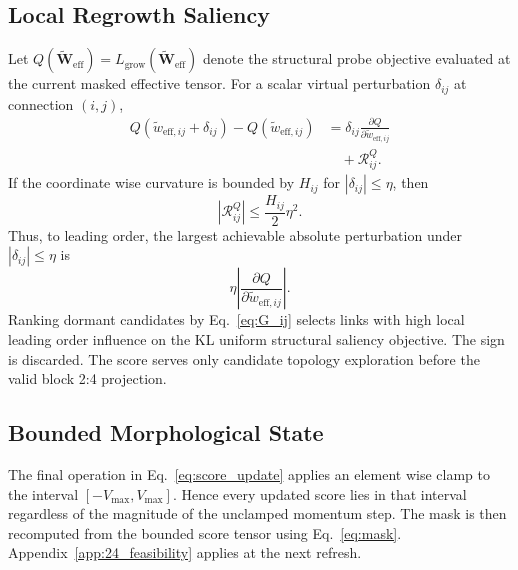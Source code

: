 \documentclass[letterpaper]{article}
\begin{document}
\subsection{Local Regrowth Saliency}
\label{app:regrowth_saliency}
Let $Q(\widetilde{\bm{W}}_{\text{eff}})=L_{\text{grow}}(\widetilde{\bm{W}}_{\text{eff}})$ denote the structural probe objective evaluated at the current masked effective tensor. For a scalar virtual perturbation $\delta_{ij}$ at connection $(i,j)$,
\begin{equation}
\begin{aligned}
    Q(\widetilde w_{\mathrm{eff},ij}+\delta_{ij})
    -Q(\widetilde w_{\mathrm{eff},ij})
    &=\delta_{ij}\frac{\partial Q}
    {\partial\widetilde w_{\mathrm{eff},ij}}\\
    &\quad+\mathcal R^Q_{ij}.
\end{aligned}
\end{equation}
If the coordinate wise curvature is bounded by $H_{ij}$ for $|\delta_{ij}|\le\eta$, then
\[
    |\mathcal{R}^{Q}_{ij}|
    \le
    \frac{H_{ij}}{2}\eta^2.
\]
Thus, to leading order, the largest achievable absolute perturbation under $|\delta_{ij}|\le\eta$ is
\[
    \eta\left|
    \frac{\partial Q}{\partial \widetilde{w}_{\text{eff},ij}}
    \right|.
\]
Ranking dormant candidates by Eq.~\ref{eq:G_ij} selects links with high local leading order influence on the KL uniform structural saliency objective. The sign is discarded. The score serves only candidate topology exploration before the valid block 2:4 projection.

\subsection{Bounded Morphological State}
The final operation in Eq.~\ref{eq:score_update} applies an element wise clamp to the interval $[-V_{\max},V_{\max}]$. Hence every updated score lies in that interval regardless of the magnitude of the unclamped momentum step. The mask is then recomputed from the bounded score tensor using Eq.~\ref{eq:mask}. Appendix~\ref{app:24_feasibility} applies at the next refresh.
\end{document}
